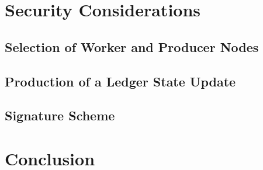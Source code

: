 \documentclass[a4paper, 12pt]{book}
\begin{document}




%


\chapter{Security Considerations} \label{Cha:Sec}




\section{Selection of Worker and Producer Nodes}\label{Sec:ConSec}



\section{Production of a Ledger State Update}\label{Sec:SecLsu}




\section{Signature Scheme}\label{Sec:SSS}





\chapter*{Conclusion} \label{Cha:Con}




\begin{raggedright}
\normalem
\printbibliography

\end{raggedright}
\end{document}
